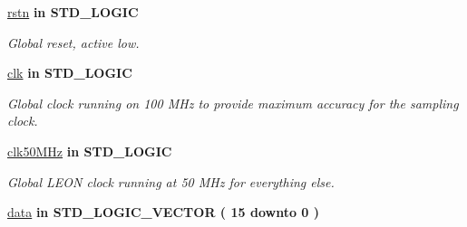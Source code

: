  \begin{DoxyCompactItemize}
\item 
\hypertarget{classdac__Top_aba021aec4b477b89079bb58ccadcc67e}{\hyperlink{classdac__Top_aba021aec4b477b89079bb58ccadcc67e}{rstn}  {\bfseries {\bfseries \textcolor{vhdlkeyword}{in}\textcolor{vhdlchar}{ }}} {\bfseries \textcolor{comment}{S\-T\-D\-\_\-\-L\-O\-G\-I\-C}\textcolor{vhdlchar}{ }} }\label{classdac__Top_aba021aec4b477b89079bb58ccadcc67e}

\begin{DoxyCompactList}\small\item\em Global reset, active low. \end{DoxyCompactList}\item 
\hypertarget{classdac__Top_a8120037e0ee47c35ba2d79242209c72e}{\hyperlink{classdac__Top_a8120037e0ee47c35ba2d79242209c72e}{clk}  {\bfseries {\bfseries \textcolor{vhdlkeyword}{in}\textcolor{vhdlchar}{ }}} {\bfseries \textcolor{comment}{S\-T\-D\-\_\-\-L\-O\-G\-I\-C}\textcolor{vhdlchar}{ }} }\label{classdac__Top_a8120037e0ee47c35ba2d79242209c72e}

\begin{DoxyCompactList}\small\item\em Global clock running on 100 M\-Hz to provide maximum accuracy for the sampling clock. \end{DoxyCompactList}\item 
\hypertarget{classdac__Top_a4f305185694168405a38c701331c178e}{\hyperlink{classdac__Top_a4f305185694168405a38c701331c178e}{clk50\-M\-Hz}  {\bfseries {\bfseries \textcolor{vhdlkeyword}{in}\textcolor{vhdlchar}{ }}} {\bfseries \textcolor{comment}{S\-T\-D\-\_\-\-L\-O\-G\-I\-C}\textcolor{vhdlchar}{ }} }\label{classdac__Top_a4f305185694168405a38c701331c178e}

\begin{DoxyCompactList}\small\item\em Global L\-E\-O\-N clock running at 50 M\-Hz for everything else. \end{DoxyCompactList}\item 
\hypertarget{classdac__Top_a2cc65ad6f0f6d24cd3ebac8757953224}{\hyperlink{classdac__Top_a2cc65ad6f0f6d24cd3ebac8757953224}{data}  {\bfseries {\bfseries \textcolor{vhdlkeyword}{in}\textcolor{vhdlchar}{ }}} {\bfseries \textcolor{comment}{S\-T\-D\-\_\-\-L\-O\-G\-I\-C\-\_\-\-V\-E\-C\-T\-O\-R}\textcolor{vhdlchar}{ }\textcolor{vhdlchar}{(}\textcolor{vhdlchar}{ }\textcolor{vhdlchar}{ } \textcolor{vhdldigit}{15} \textcolor{vhdlchar}{ }\textcolor{vhdlchar}{ }\textcolor{vhdlchar}{ }\textcolor{vhdlkeyword}{downto}\textcolor{vhdlchar}{ }\textcolor{vhdlchar}{ }\textcolor{vhdlchar}{ } \textcolor{vhdldigit}{0} \textcolor{vhdlchar}{ }\textcolor{vhdlchar}{)}\textcolor{vhdlchar}{ }} }\label{classdac__Top_a2cc65ad6f0f6d24cd3ebac8757953224}


\end{DoxyCompactItemize}
